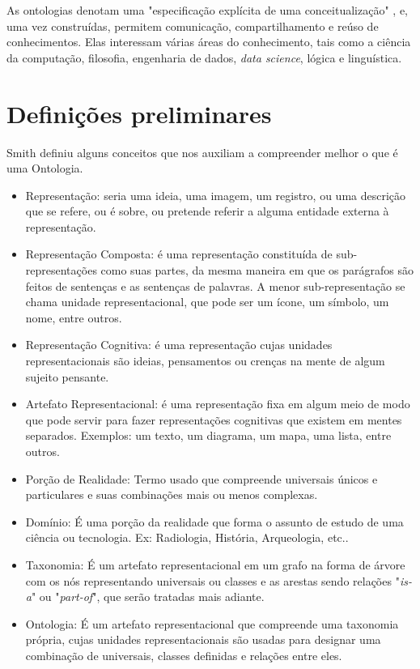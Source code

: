 As ontologias denotam uma "especificação explícita de uma conceitualização" \cite{ontoGruber}, e, uma vez construídas, permitem comunicação, compartilhamento e reúso de conhecimentos. Elas interessam várias áreas do conhecimento, tais como a ciência da computação, filosofia, engenharia de dados, \textit{data science}, lógica e linguística.

\section{Definições preliminares}

Smith \cite{ontoSmith} definiu alguns conceitos que nos auxiliam a compreender melhor o que é uma Ontologia.

\begin{itemize}
	\item Representação: seria uma ideia, uma imagem, um registro, ou uma descrição que se refere, ou é sobre, ou pretende referir a alguma entidade externa à representação.
	\item Representação Composta: é uma representação constituída de sub-representações como suas partes, da mesma maneira em que os parágrafos são feitos de sentenças e as sentenças de palavras. A menor sub-representação se chama unidade representacional, que pode ser um ícone, um símbolo, um nome, entre outros.
	\item Representação Cognitiva: é uma representação cujas unidades representacionais são ideias, pensamentos ou crenças na mente de algum sujeito pensante.
	\item Artefato Representacional: é uma representação fixa em algum meio de modo que pode servir para fazer representações cognitivas que existem em mentes separados. Exemplos: um texto, um diagrama, um mapa, uma lista, entre outros.
	\item Porção de Realidade: Termo usado que compreende universais únicos e particulares e suas combinações mais ou menos complexas.
	\item Domínio: É uma porção da realidade que forma o assunto de estudo de uma ciência ou tecnologia. Ex: Radiologia, História, Arqueologia, etc..
	\item Taxonomia: É um artefato representacional em um grafo na forma de árvore com os nós representando universais ou classes e as arestas sendo relações "\textit{is-a}" ou "\textit{part-of}", que serão tratadas mais adiante.
	\item Ontologia: É um artefato representacional que compreende uma taxonomia própria, cujas unidades representacionais são usadas para designar uma combinação de universais, classes definidas e relações entre eles.
\end{itemize} 

